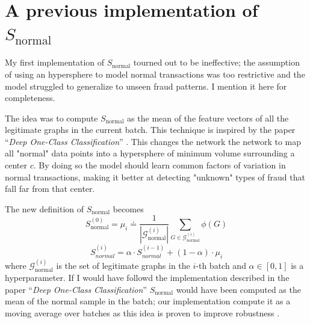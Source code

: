 \chapter{A previous implementation of {\texorpdfstring{$S_{\mathrm{normal}}$}{S\_normal}}}\label{firstmethod}
My first implementation of \(S_\text{normal}\) tourned out to be ineffective; the assumption of using an hypersphere to model normal transactions was too restrictive and the model struggled to generalize to unseen fraud patterns. I mention it here for completeness.

The idea was to compute \(S_\text{normal}\) as the mean of the feature vectors of all the legitimate graphs in the current batch. This technique is inspired by the paper ``\textit{Deep One-Class Classification}'' \cite{pmlrRuff18}. This changes the network the network to map all "normal" data points into a hypersphere of minimum volume surrounding a center \(c\). By doing so the model should learn common factors of variation in normal transactions, making it better at detecting "unknown" types of fraud that fall far from that center.

The new definition of \(S_\text{normal}\) becomes
\begin{equation}
    S_\text{normal}^{(0)} = \mu_{i} \doteq \frac{1}{|\mathcal{G}_\text{normal}^{(i)}|}\sum_{G \in \mathcal{G}_\text{normal}^{(i)}} \phi(G)
\end{equation}
\begin{equation}
    S_{normal}^{(i)} = \alpha \cdot S_{normal}^{(i-1)} + (1 - \alpha) \cdot \mu_{i}
\end{equation}
where \(\mathcal{G}_\text{normal}^{(i)}\) is the set of legitimate graphs in the \(i\)-th batch and \(\alpha \in [0,1]\) is a hyperparameter. If I would have followd the implementation described in the paper ``\textit{Deep One-Class Classification}'' \cite{pmlrRuff18} \(S_\text{normal}\) would have been computed as the mean of the normal sample in the batch; our implementation compute it as a moving average over batches as this idea is proven to improve robustness \cite{momentum}.

